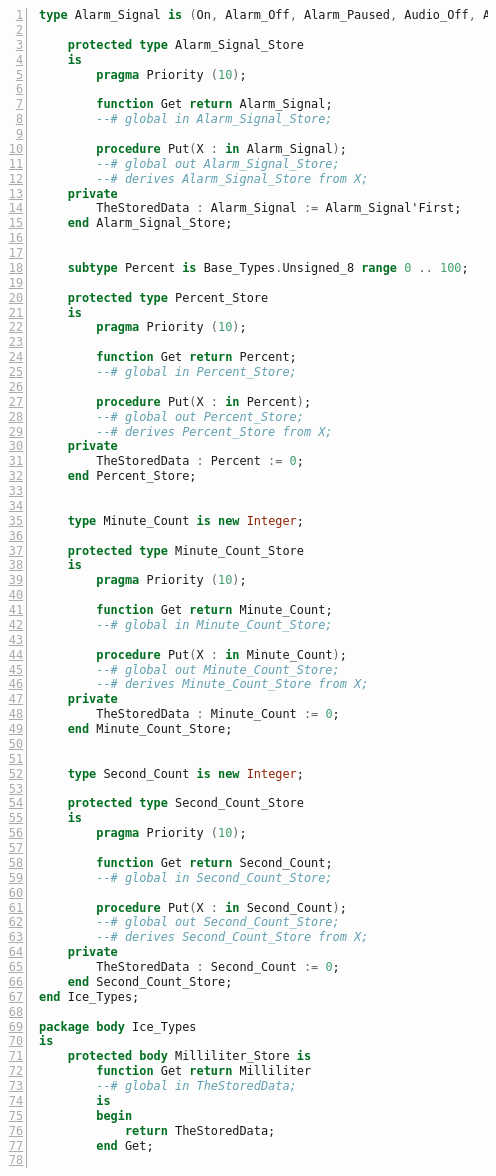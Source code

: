 \begin{lstlisting}[language=ada, gobble=0, numbers=left, caption={\lstinline{Ice_Types} package}]
    type Alarm_Signal is (On, Alarm_Off, Alarm_Paused, Audio_Off, Audio_Paused);

    protected type Alarm_Signal_Store
    is
        pragma Priority (10);

        function Get return Alarm_Signal;
        --# global in Alarm_Signal_Store;

        procedure Put(X : in Alarm_Signal);
        --# global out Alarm_Signal_Store;
        --# derives Alarm_Signal_Store from X;
    private
        TheStoredData : Alarm_Signal := Alarm_Signal'First;
    end Alarm_Signal_Store;


    subtype Percent is Base_Types.Unsigned_8 range 0 .. 100;

    protected type Percent_Store
    is
        pragma Priority (10);

        function Get return Percent;
        --# global in Percent_Store;

        procedure Put(X : in Percent);
        --# global out Percent_Store;
        --# derives Percent_Store from X;
    private
        TheStoredData : Percent := 0;
    end Percent_Store;


    type Minute_Count is new Integer;

    protected type Minute_Count_Store
    is
        pragma Priority (10);

        function Get return Minute_Count;
        --# global in Minute_Count_Store;

        procedure Put(X : in Minute_Count);
        --# global out Minute_Count_Store;
        --# derives Minute_Count_Store from X;
    private
        TheStoredData : Minute_Count := 0;
    end Minute_Count_Store;


    type Second_Count is new Integer;

    protected type Second_Count_Store
    is
        pragma Priority (10);

        function Get return Second_Count;
        --# global in Second_Count_Store;

        procedure Put(X : in Second_Count);
        --# global out Second_Count_Store;
        --# derives Second_Count_Store from X;
    private
        TheStoredData : Second_Count := 0;
    end Second_Count_Store;
end Ice_Types;

package body Ice_Types
is
    protected body Milliliter_Store is
        function Get return Milliliter
        --# global in TheStoredData;
        is
        begin
            return TheStoredData;
        end Get;


\end{lstlisting}
